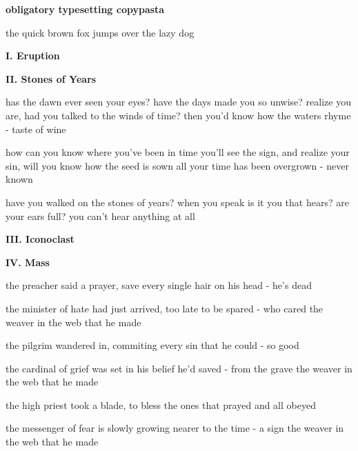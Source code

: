 \documentclass{article}
\renewcommand{\part}[1]{
  \begin{center}
    \textbf{#1}
  \end{center}
  \fontcream
}
\begin{document}
\noindent

\part{obligatory typesetting copypasta}

the quick brown fox jumps over the lazy dog

\part{I. Eruption}

\part{II. Stones of Years}

has the dawn ever seen your eyes?
have the days made you so unwise?
realize you are,
had you talked to the winds of time?
then you'd know how the waters rhyme
- taste of wine

how can you know where you've been
in time you'll see the sign,
and realize your sin,
will you know how the seed is sown
all your time has been overgrown
- never known

have you walked on the stones of years?
when you speak is it you that hears?
are your ears full?
you can't hear anything at all

\part{III. Iconoclast}

\part{IV. Mass}

the preacher said a prayer,
save every single hair on his head
- he's dead

the minister of hate had just arrived, too late to be spared
- who cared
the weaver in the web that he made

the pilgrim wandered in,
commiting every sin that he could
- so good

the cardinal of grief was set in his belief he'd saved
- from the grave
the weaver in the web that he made

the high priest took a blade,
to bless the ones that prayed
and all obeyed

the messenger of fear is slowly growing nearer to the time
- a sign
the weaver in the web that he made
\end{document}
